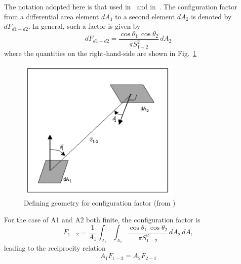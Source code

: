 The notation adopted here is that used in~\cite{siegel-howell-3} and in~\cite{catalog}. The configuration factor from a differential area element $dA_1$ to a second element $dA_2$ is denoted by $dF_{d1-d2}$. In general, such a factor is given by 
\begin{equation}
dF_{d1-d2}=\frac{\cos \theta_1 \, \cos \theta_2}{\pi S_{1-2}^2}\,dA_2
\end{equation}
where the quantities on the right-hand-side are shown in Fig.~\ref{fig:in-fi(1)}
\begin{figure}[htbp]
\begin{center}
 \includegraphics[width=8cm]{Sec_SiteInfra/Cryotraps/in-fi(1).pdf}
			\caption{Defining geometry for configuration factor (from \cite{catalog})}
\label{fig:in-fi(1)}
\end{center}
\end{figure}

For the case of A1 and A2 both finite, the configuration factor is 
\begin{equation}
F_{1-2 } = \frac{1}{A_1}\int_{A_1}\int_{A_2}\frac{\cos \theta_1 \, \cos \theta_2}{\pi S_{1-2}^2}\,dA_2\,dA_1
\end{equation}
leading to the reciprocity relation 
\begin{equation}
A_1 F_{1-2} = A_2 F_{2-1}
\end{equation}

